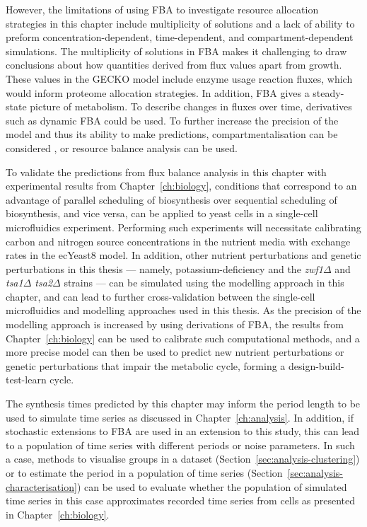 However, the limitations of using FBA to investigate resource allocation strategies in this chapter include multiplicity of solutions and a lack of ability to preform concentration-dependent, time-dependent, and compartment-dependent simulations.
The multiplicity of solutions in FBA makes it challenging to draw conclusions about how quantities derived from flux values apart from growth.
These values in the GECKO model include enzyme usage reaction fluxes, which would inform proteome allocation strategies.
In addition, FBA gives a steady-state picture of metabolism.
To describe changes in fluxes over time, derivatives such as dynamic FBA \parencite{mahadevanDynamicFluxBalance2002} could be used.
To further increase the precision of the model and thus its ability to make predictions, compartmentalisation can be considered \parencite{elsemmanWholecellModelingYeast2022}, or resource balance analysis \parencite{goelzerCellDesignBacteria2011} can be used.

To validate the predictions from flux balance analysis in this chapter with experimental results from Chapter~\ref{ch:biology}, conditions that correspond to an advantage of parallel scheduling of biosynthesis over sequential scheduling of biosynthesis, and vice versa, can be applied to yeast cells in a single-cell microfluidics experiment.
Performing such experiments will necessitate calibrating carbon and nitrogen source concentrations in the nutrient media with exchange rates in the ecYeast8 model.
In addition, other nutrient perturbations and genetic perturbations in this thesis --- namely, potassium-deficiency and the \textit{zwf1$\Delta$} and \textit{tsa1$\Delta$ tsa2$\Delta$} strains --- can be simulated using the modelling approach in this chapter, and can lead to further cross-validation between the single-cell microfluidics and modelling approaches used in this thesis.
As the precision of the modelling approach is increased by using derivations of FBA, the results from Chapter~\ref{ch:biology} can be used to calibrate such computational methods, and a more precise model can then be used to predict new nutrient perturbations or genetic perturbations that impair the metabolic cycle, forming a design-build-test-learn cycle.

The synthesis times predicted by this chapter may inform the period length to be used to simulate time series as discussed in Chapter~\ref{ch:analysis}.
In addition, if stochastic extensions to FBA \parencite{tourignySimulatingSinglecellMetabolism2021,labhsetwarPopulationFBAPredicts2017} are used in an extension to this study, this can lead to a population of time series with different periods or noise parameters.
In such a case, methods to visualise groups in a dataset (Section~\ref{sec:analysis-clustering}) or to estimate the period in a population of time series (Section~\ref{sec:analysis-characterisation}) can be used to evaluate whether the population of simulated time series in this case approximates recorded time series from cells as presented in Chapter~\ref{ch:biology}.
